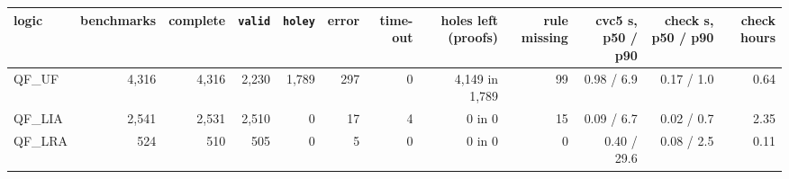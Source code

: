 \begin{tabular}{lrrrrrrrrrrr}
\toprule
logic & benchmarks & complete & \texttt{valid} & \texttt{holey} & error & time-out & holes left (proofs) & rule missing & cvc5 s, p50 / p90 & check s, p50 / p90 & check hours \\
\midrule
QF\_UF & 4,316 & 4,316 & 2,230 & 1,789 & 297 & 0 & 4,149 in 1,789 & 99 & 0.98 / 6.9 & 0.17 / 1.0 & 0.64 \\
QF\_LIA & 2,541 & 2,531 & 2,510 & 0 & 17 & 4 & 0 in 0 & 15 & 0.09 / 6.7 & 0.02 / 0.7 & 2.35 \\
QF\_LRA & 524 & 510 & 505 & 0 & 5 & 0 & 0 in 0 & 0 & 0.40 / 29.6 & 0.08 / 2.5 & 0.11 \\
\bottomrule
\end{tabular}
